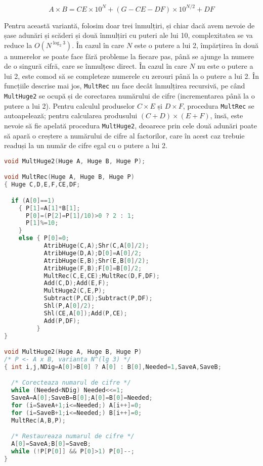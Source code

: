 \begin{equation}
  A \times B = CE \times 10^{N} + (G - CE - DF) \times 10^{N / 2} + DF
\end{equation}
	
Pentru această variantă, folosim doar trei înmulțiri, și chiar dacă avem
nevoie de șase adunări și scăderi și două înmulțiri cu puteri ale lui 10,
complexitatea se va reduce la $O(N^{\log_2 3})$. În cazul în care $N$ este o
putere a lui 2, împărțirea în două a numerelor se poate face fără probleme la
fiecare pas, până se ajunge la numere de o singură cifră, care se înmulțesc
direct. În cazul în care $N$ nu este o putere a lui 2, este comod să se
completeze numerele cu zerouri până la o putere a lui 2. În funcțiile descrise
mai jos, {\tt MultRec} nu face decât înmulțirea recursivă, pe când {\tt
  MultHuge2} se ocupă și de corectarea numărului de cifre (incrementarea până
la o putere a lui 2). Pentru calculul produselor $C \times E$ și $D \times F$,
procedura {\tt MultRec} se autoapelează; pentru calcularea produsului $(C+D)
\times (E+F)$, însă, este nevoie să fie apelată procedura {\tt MultHuge2},
deoarece prin cele două adunări poate să apară o creștere a numărului de cifre
al factorilor, care în acest caz trebuie readuși la un număr de cifre egal cu
o putere a lui 2.

\begin{lstlisting}[language=C]
void MultHuge2(Huge A, Huge B, Huge P);

void MultRec(Huge A, Huge B, Huge P)
{ Huge C,D,E,F,CE,DF;

  if (A[0]==1)
    { P[1]=A[1]*B[1];
      P[0]=(P[2]=P[1]/10)>0 ? 2 : 1;
      P[1]%=10;
    }
    else { P[0]=0;
           AtribHuge(C,A);Shr(C,A[0]/2);
           AtribHuge(D,A);D[0]=A[0]/2;
           AtribHuge(E,B);Shr(E,B[0]/2);
           AtribHuge(F,B);F[0]=B[0]/2;
           MultRec(C,E,CE);MultRec(D,F,DF);
           Add(C,D);Add(E,F);
           MultHuge2(C,E,P);
           Subtract(P,CE);Subtract(P,DF);
           Shl(P,A[0]/2);
           Shl(CE,A[0]);Add(P,CE);
           Add(P,DF);
         }
}

void MultHuge2(Huge A, Huge B, Huge P)
/* P <- A x B, varianta N^(lg 3) */
{ int i,j,NDig=A[0]>B[0] ? A[0] : B[0],Needed=1,SaveA,SaveB;

  /* Corecteaza numarul de cifre */
  while (Needed<NDig) Needed<<=1;
  SaveA=A[0];SaveB=B[0];A[0]=B[0]=Needed;
  for (i=SaveA+1;i<=Needed;) A[i++]=0;
  for (i=SaveB+1;i<=Needed;) B[i++]=0;
  MultRec(A,B,P);

  /* Restaureaza numarul de cifre */
  A[0]=SaveA;B[0]=SaveB;
  while (!P[P[0]] && P[0]>1) P[0]--;
}
\end{lstlisting}

